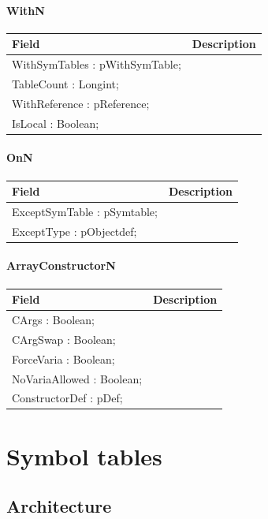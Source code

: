 \documentclass [a4paper,12pt]{article}
\begin{document}
\paragraph{WithN}\mbox{}

\begin{longtable}{|l|p{10cm}|}
\hline
Field	& Description \\
\hline
\endhead
\hline
\endfoot
\textsf{WithSymTables : pWithSymTable;} &  \\
\textsf{TableCount : Longint;}		&  \\
\textsf{WithReference : pReference;}	&  \\
\textsf{IsLocal : Boolean;}		& 
\label{tab32}
\end{longtable}

\paragraph{OnN}\mbox{}

\begin{longtable}{|l|p{10cm}|}
\hline
Field	& Description \\
\hline
\endhead
\hline
\endfoot
\textsf{ExceptSymTable : pSymtable;}&  \\
\textsf{ExceptType : pObjectdef;}& 
\label{tab33}
\end{longtable}

\paragraph{ArrayConstructorN}\mbox{}

\begin{longtable}{|l|p{10cm}|}
\hline
Field	& Description \\
\hline
\endhead
\hline
\endfoot
\textsf{CArgs : Boolean;}		&  \\
\textsf{CArgSwap : Boolean;}		&  \\
\textsf{ForceVaria : Boolean;}		&  \\
\textsf{NoVariaAllowed : Boolean;}	&  \\
\textsf{ConstructorDef : pDef;}		& 
\label{tab34}
\end{longtable}

\section{Symbol tables}
\label{sec:symbol}

\subsection{Architecture}
\label{subsec:architecturesructord}
\end{document}

